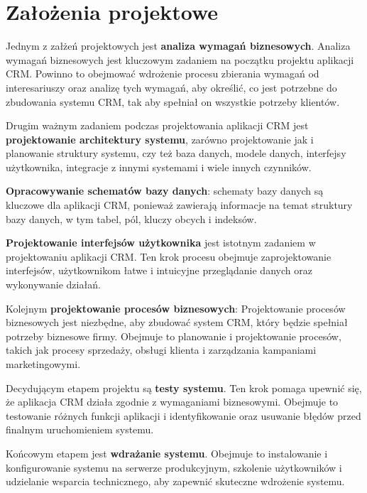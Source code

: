\documentclass[12pt,a4paper]{article}
\begin{document}
\newpage

\section{Założenia projektowe}

\vspace{12pt}\hspace{0,6cm}Jednym z załżeń projektowych jest \textbf{analiza wymagań biznesowych}. Analiza wymagań biznesowych jest kluczowym zadaniem na początku projektu aplikacji CRM. Powinno to obejmować wdrożenie procesu zbierania wymagań od interesariuszy oraz analizę tych wymagań, aby określić, co jest potrzebne do zbudowania systemu CRM, tak aby spełniał on wszystkie potrzeby klientów.

\vspace{12pt}Drugim ważnym zadaniem podczas projektowania aplikacji CRM jest \textbf{projektowanie architektury systemu}, zarówno projektowanie jak i planowanie struktury systemu, czy też baza danych, modele danych, interfejsy użytkownika, integracje z innymi systemami i wiele innych czynników. 

\vspace{12pt}\textbf{Opracowywanie schematów bazy danych}: schematy bazy danych są kluczowe dla aplikacji CRM, ponieważ zawierają informacje na temat struktury bazy danych, w tym tabel, pól, kluczy obcych i indeksów.

\vspace{12pt}\textbf{Projektowanie interfejsów użytkownika} jest istotnym zadaniem w projektowaniu aplikacji CRM. Ten krok procesu obejmuje zaprojektowanie interfejsów, użytkownikom łatwe i intuicyjne przeglądanie danych oraz wykonywanie działań.

\vspace{12pt}Kolejnym \textbf{projektowanie procesów biznesowych}: Projektowanie procesów biznesowych jest niezbędne, aby zbudować system CRM, który będzie spełniał potrzeby biznesowe firmy. Obejmuje to planowanie i projektowanie procesów, takich jak procesy sprzedaży, obsługi klienta i zarządzania kampaniami marketingowymi.

\vspace{12pt}Decydującym etapem projektu są \textbf{testy systemu}. Ten krok pomaga upewnić się, że aplikacja CRM działa zgodnie z wymaganiami biznesowymi. Obejmuje to testowanie różnych funkcji aplikacji i identyfikowanie oraz usuwanie błędów przed finalnym uruchomieniem systemu.

\vspace{12pt}Końcowym etapem jest \textbf{wdrażanie systemu}. Obejmuje to instalowanie i konfigurowanie systemu na serwerze produkcyjnym, szkolenie użytkowników i udzielanie wsparcia technicznego, aby zapewnić skuteczne wdrożenie systemu.
\end{document}
